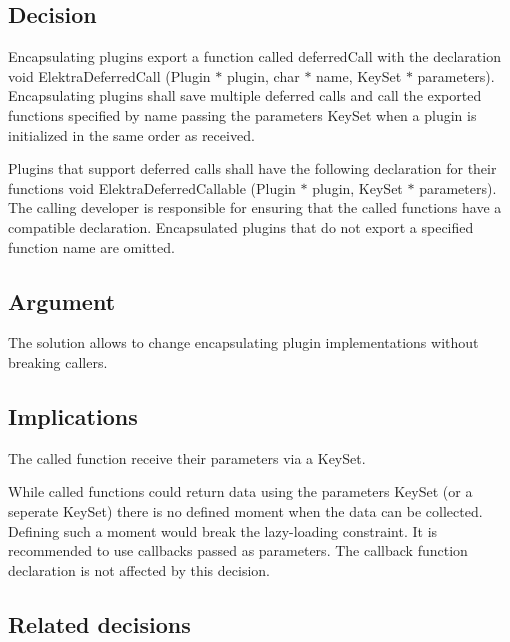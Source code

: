 \subsection*{Decision}

Encapsulating plugins export a function called {\ttfamily deferred\+Call} with the declaration {\ttfamily void Elektra\+Deferred\+Call (Plugin $\ast$ plugin, char $\ast$ name, Key\+Set $\ast$ parameters)}. Encapsulating plugins shall save multiple deferred calls and call the exported functions specified by {\ttfamily name} passing the {\ttfamily parameters} Key\+Set when a plugin is initialized in the same order as received.

Plugins that support deferred calls shall have the following declaration for their functions {\ttfamily void Elektra\+Deferred\+Callable (Plugin $\ast$ plugin, Key\+Set $\ast$ parameters)}. The calling developer is responsible for ensuring that the called functions have a compatible declaration. Encapsulated plugins that do not export a specified function name are omitted.

\subsection*{Argument}

The solution allows to change encapsulating plugin implementations without breaking callers.

\subsection*{Implications}

The called function receive their parameters via a Key\+Set.

While called functions could return data using the {\ttfamily parameters} Key\+Set (or a seperate Key\+Set) there is no defined moment when the data can be collected. Defining such a moment would break the lazy-\/loading constraint. It is recommended to use callbacks passed as {\ttfamily parameters}. The callback function declaration is not affected by this decision.

\subsection*{Related decisions}


